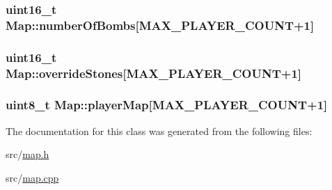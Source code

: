 \subsubsection[{\texorpdfstring{number\+Of\+Bombs}{numberOfBombs}}]{\setlength{\rightskip}{0pt plus 5cm}uint16\+\_\+t Map\+::number\+Of\+Bombs\mbox{[}M\+A\+X\+\_\+\+P\+L\+A\+Y\+E\+R\+\_\+\+C\+O\+U\+NT+1\mbox{]}\hspace{0.3cm}{\ttfamily [private]}}\hypertarget{class_map_a197993ac9081132287bd705e6cb35ad7}{}\label{class_map_a197993ac9081132287bd705e6cb35ad7}
\subsubsection[{\texorpdfstring{override\+Stones}{overrideStones}}]{\setlength{\rightskip}{0pt plus 5cm}uint16\+\_\+t Map\+::override\+Stones\mbox{[}M\+A\+X\+\_\+\+P\+L\+A\+Y\+E\+R\+\_\+\+C\+O\+U\+NT+1\mbox{]}\hspace{0.3cm}{\ttfamily [private]}}\hypertarget{class_map_a2aa24c981137566a7e6265d7663f912a}{}\label{class_map_a2aa24c981137566a7e6265d7663f912a}
\subsubsection[{\texorpdfstring{player\+Map}{playerMap}}]{\setlength{\rightskip}{0pt plus 5cm}uint8\+\_\+t Map\+::player\+Map\mbox{[}M\+A\+X\+\_\+\+P\+L\+A\+Y\+E\+R\+\_\+\+C\+O\+U\+NT+1\mbox{]}\hspace{0.3cm}{\ttfamily [private]}}\hypertarget{class_map_adfa71361123d8f8838cded1198e69c1e}{}\label{class_map_adfa71361123d8f8838cded1198e69c1e}


The documentation for this class was generated from the following files\+:\begin{DoxyCompactItemize}
\item 
src/\hyperlink{map_8h}{map.\+h}\item 
src/\hyperlink{map_8cpp}{map.\+cpp}\end{DoxyCompactItemize}
